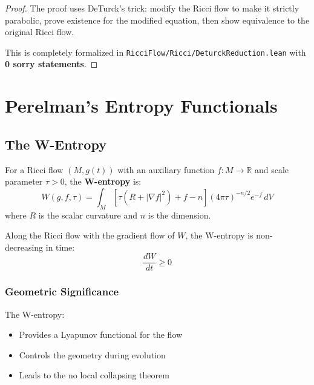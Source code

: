 \begin{proof}
The proof uses DeTurck's trick: modify the Ricci flow to make it strictly parabolic, prove existence for the modified equation, then show equivalence to the original Ricci flow.

This is completely formalized in \texttt{RicciFlow/Ricci/DeturckReduction.lean} with \textbf{0 sorry statements}.
\end{proof}

\chapter{Perelman's Entropy Functionals}
\label{chap:entropy}

\section{The W-Entropy}

\begin{definition}[W-Entropy]
\label{def:w_entropy}
For a Ricci flow $(M, g(t))$ with an auxiliary function $f : M \to \mathbb{R}$ and scale parameter $\tau > 0$, the \textbf{W-entropy} is:
\[
W(g, f, \tau) = \int_M \left[\tau(R + |\nabla f|^2) + f - n\right] (4\pi\tau)^{-n/2} e^{-f} \, dV
\]
where $R$ is the scalar curvature and $n$ is the dimension.
\end{definition}

\begin{theorem}
\label{thm:w_entropy_monotone}
Along the Ricci flow with the gradient flow of $W$, the W-entropy is non-decreasing in time:
\[
\frac{dW}{dt} \geq 0
\]
\end{theorem}

\subsection{Geometric Significance}

The W-entropy:
\begin{itemize}
\item Provides a Lyapunov functional for the flow
\item Controls the geometry during evolution
\item Leads to the no local collapsing theorem
\end{itemize}

